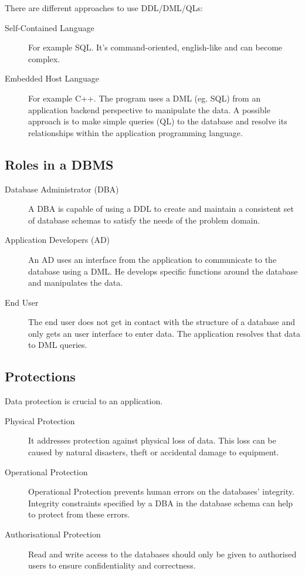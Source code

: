 \documentclass[a4paper,twocolumn]{article}
\begin{document}
There are different approaches to use DDL/DML/QLs:
%
\begin{description}
  \item[Self-Contained Language]
    For example SQL. It's command-oriented, english-like
    and can become complex.
  \item[Embedded Host Language]
    For example C++. The program uses a DML (eg. SQL) from an application
    backend perspective to manipulate the data. A possible approach is to
    make simple queries (QL) to the database and resolve its relationships
    within the application programming language.
\end{description}

\subsection{Roles in a DBMS}

\begin{description}
  \item[Database Administrator (DBA)]
    A DBA is capable of using a DDL to create and maintain a
    consistent set of database schemas to satisfy the needs of the
    problem domain.
  \item[Application Developers (AD)]
    An AD uses an interface from the application to communicate to the
    database using a DML. He develops specific functions around the database
    and manipulates the data.
  \item[End User] The end user does not get in contact with the structure of
    a database and only gets an user interface to enter data. The
    application resolves that data to DML queries.
\end{description}

\subsection{Protections}

Data protection is crucial to an application.
%
\begin{description}
  \item[Physical Protection]
    It addresses protection against physical loss of data.
    This loss can be caused by natural disasters, theft or accidental damage
    to equipment.

  \item[Operational Protection]
    Operational Protection prevents human errors on the databases'
    integrity. Integrity constraints specified by a DBA in the database
    schema can help to protect from these errors.

  \item[Authorisational Protection]
    Read and write access to the databases should only be given to
    authorised users to ensure confidentiality and correctness.
\end{description}
\end{document}
